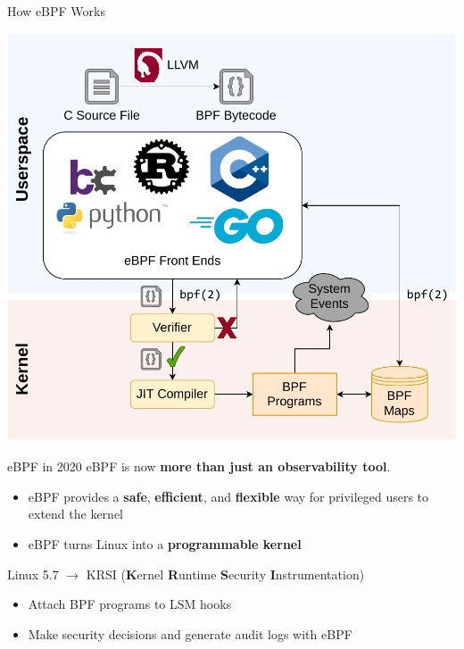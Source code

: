 \documentclass[12pt, dvipsnames]{beamer}
\begin{document}
\begin{frame}[c]{How eBPF Works}
\begin{center}
    \color{black}
    \includegraphics[height=0.8\textheight]{figs/how-ebpf-works.pdf}
\end{center}
\end{frame}

\begin{frame}[c]{eBPF in 2020}
eBPF is now \textbf{more than just an observability tool}.
\begin{itemize}
    \item eBPF provides a \textbf{safe}, \textbf{efficient}, and \textbf{flexible} way for privileged users to extend the kernel
    \item eBPF turns Linux into a \textbf{programmable kernel}
\end{itemize}
\vfill
Linux 5.7 $\rightarrow$ KRSI (\textbf{K}ernel \textbf{R}untime \textbf{S}ecurity \textbf{I}nstrumentation)
\begin{itemize}
    \item Attach BPF programs to LSM hooks
    \item Make security decisions and generate audit logs with eBPF
\end{itemize}
\end{frame}

\end{document}
